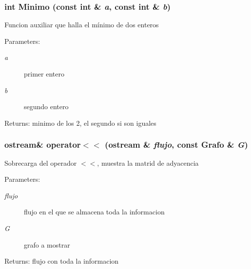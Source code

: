\subsubsection{\setlength{\rightskip}{0pt plus 5cm}int Minimo (const int \& {\em a}, const int \& {\em b})}\label{grafo_8cpp_ad08456ae6cb5f9aaaee75537f6ef90a}


Funcion auxiliar que halla el mínimo de dos enteros \begin{Desc}
\item[Parameters:]
\begin{description}
\item[{\em a}]primer entero \item[{\em b}]segundo entero \end{description}
\end{Desc}
\begin{Desc}
\item[Returns:]minimo de los 2, el segundo si son iguales \end{Desc}
\subsubsection{\setlength{\rightskip}{0pt plus 5cm}ostream\& operator$<$$<$ (ostream \& {\em flujo}, const {\bf Grafo} \& {\em G})}\label{grafo_8cpp_a10916bc791b8c23a52309107d104932}


Sobrecarga del operador $<$$<$, muestra la matrid de adyacencia \begin{Desc}
\item[Parameters:]
\begin{description}
\item[{\em flujo}]flujo en el que se almacena toda la informacion \item[{\em G}]grafo a mostrar \end{description}
\end{Desc}
\begin{Desc}
\item[Returns:]flujo con toda la informacion \end{Desc}
